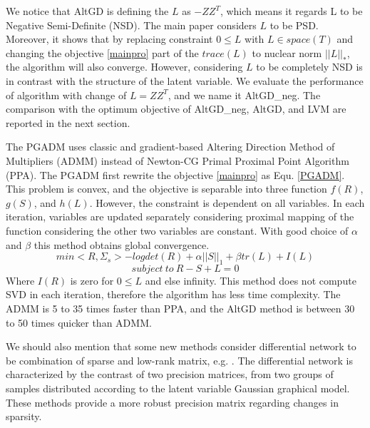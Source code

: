 \documentclass[10pt,conference]{IEEEtran}
\begin{document}
We notice that AltGD \cite{xu2017speeding} is defining the $L$ as $-Z Z^T$, which means it regards L to be Negative Semi-Definite (NSD). The main paper \cite{Chandra_1} considers $L$ to be PSD. Moreover, it \cite{Chandra_1} shows that by replacing constraint $0 \leq L$ with $L \in space(T)$ and changing the objective \ref{mainpro} part of the $trace(L)$ to nuclear norm $||L||_*$, the algorithm will also converge. However, considering $L$ to be completely NSD is in contrast with the structure of the latent variable. We evaluate the performance of algorithm with change of $L = Z Z^T$, and we name it AltGD\_neg. The comparison with the optimum objective of AltGD\_neg, AltGD, and LVM are reported in the next section. 

The PGADM \cite{ma2013alternating} uses classic and gradient-based Altering Direction Method of Multipliers (ADMM) instead of Newton-CG Primal Proximal Point Algorithm (PPA). The PGADM first rewrite the objective \ref{mainpro} as Equ. \ref{PGADM}. This problem is convex, and the objective is separable into three function $f(R)$, $g(S)$, and $h(L)$. However, the constraint is dependent on all variables. In each iteration, variables are updated separately considering proximal mapping of the function considering the other two variables are constant. With good choice of $\alpha$ and $\beta$ this method obtains global convergence. 
\begin{equation}
    min <R,\Sigma_s> - logdet(R) + \alpha ||S||_1 + \beta tr(L) + I(L) \nonumber
\end{equation}
\begin{equation}
subject \ to \ R-S+L = 0 \label{PGADM}
\end{equation}
Where $I(R)$ is zero for $0\leq L$ and else infinity. This method does not compute SVD in each iteration, therefore the algorithm has less time complexity. The ADMM is 5 to 35 times faster than PPA, and the AltGD method is between 30 to 50 times quicker than ADMM.

We should also mention that some new methods consider differential network to be combination of sparse and low-rank matrix, e.g. \cite{na2019estimating}. The differential network is characterized by the contrast of two precision matrices, from two groups of samples distributed according to the latent variable Gaussian graphical model. These methods provide a more robust precision matrix regarding changes in sparsity.
\end{document}
